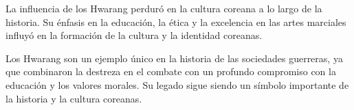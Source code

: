 La influencia de los Hwarang perduró en la cultura coreana a lo largo de la historia. Su énfasis en la educación, la ética y la excelencia en las artes marciales influyó en la formación de la cultura y la identidad coreanas.

Los Hwarang son un ejemplo único en la historia de las sociedades guerreras, ya que combinaron la destreza en el combate con un profundo compromiso con la educación y los valores morales. Su legado sigue siendo un símbolo importante de la historia y la cultura coreanas.


%
%
%
